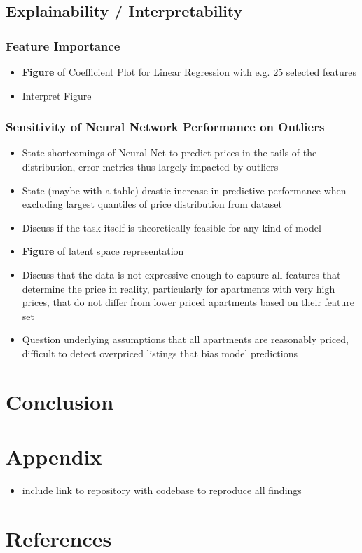 \documentclass[12pt, letterpaper]{article}
\begin{document}
\subsection{Explainability / Interpretability}

\subsubsection{Feature Importance}
\begin{itemize}
    \item \textbf{Figure} of Coefficient Plot for Linear Regression with e.g. $25$ selected features
    \item Interpret Figure
\end{itemize}

\subsubsection{Sensitivity of Neural Network Performance on Outliers}
\begin{itemize}
    \item State shortcomings of Neural Net to predict prices in the tails of the distribution, error metrics thus largely impacted by outliers
    \item State (maybe with a table) drastic increase in predictive performance when excluding largest quantiles of price distribution from dataset
    \item Discuss if the task itself is theoretically feasible for any kind of model
    \item \textbf{Figure} of latent space representation
    \item Discuss that the data is not expressive enough to capture all features that determine the price in reality, particularly for apartments with very high prices, that do not differ from lower priced apartments based on their feature set
    \item Question underlying assumptions that all apartments are reasonably priced, difficult to detect overpriced listings that bias model predictions
\end{itemize}


\section{Conclusion}


\section{Appendix}
\begin{itemize}
    \item include link to repository with codebase to reproduce all findings
\end{itemize}

\section{References}
\end{document}
